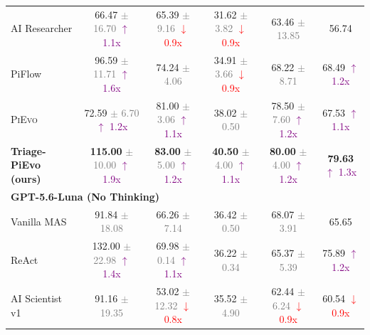 \documentclass{article}
\newcommand{\pievo}{\textsc{PiEvo}\,}
\begin{document}
\begin{table}[!ht]
{\begin{tabular}{l | cccc | c}
AI Researcher & 66.47 \textcolor{gray}{\scriptsize $\pm$ 16.70} \textcolor{purple}{\scriptsize $\uparrow$ 1.1x} & 65.39 \textcolor{gray}{\scriptsize $\pm$ 9.16} \textcolor{red}{\scriptsize $\downarrow$ 0.9x} & 31.62 \textcolor{gray}{\scriptsize $\pm$ 3.82} \textcolor{red}{\scriptsize $\downarrow$ 0.9x} & 63.46 \textcolor{gray}{\scriptsize $\pm$ 13.85} & 56.74  \\
PiFlow & 96.59 \textcolor{gray}{\scriptsize $\pm$ 11.71} \textcolor{purple}{\scriptsize $\uparrow$ 1.6x} & 74.24 \textcolor{gray}{\scriptsize $\pm$ 4.06} & 34.91 \textcolor{gray}{\scriptsize $\pm$ 3.66} \textcolor{red}{\scriptsize $\downarrow$ 0.9x} & 68.22 \textcolor{gray}{\scriptsize $\pm$ 8.71} & 68.49  \textcolor{purple}{\scriptsize $\uparrow$ 1.2x} \\
\pievo{} & 72.59 \textcolor{gray}{\scriptsize $\pm$ 6.70} \textcolor{purple}{\scriptsize $\uparrow$ 1.2x} & 81.00 \textcolor{gray}{\scriptsize $\pm$ 3.06} \textcolor{purple}{\scriptsize $\uparrow$ 1.1x} & 38.02 \textcolor{gray}{\scriptsize $\pm$ 0.50} & 78.50 \textcolor{gray}{\scriptsize $\pm$ 7.60} \textcolor{purple}{\scriptsize $\uparrow$ 1.2x} & 67.53  \textcolor{purple}{\scriptsize $\uparrow$ 1.1x} \\
\textbf{Triage-PiEvo (ours)} & \textbf{115.00} \textcolor{gray}{\scriptsize $\pm$ 10.00} \textcolor{purple}{\scriptsize $\uparrow$ 1.9x} & \textbf{83.00} \textcolor{gray}{\scriptsize $\pm$ 5.00} \textcolor{purple}{\scriptsize $\uparrow$ 1.2x} & \textbf{40.50} \textcolor{gray}{\scriptsize $\pm$ 4.00} \textcolor{purple}{\scriptsize $\uparrow$ 1.1x} & \textbf{80.00} \textcolor{gray}{\scriptsize $\pm$ 4.00} \textcolor{purple}{\scriptsize $\uparrow$ 1.2x} & \textbf{79.63}  \textcolor{purple}{\scriptsize $\uparrow$ 1.3x} \\
\midrule
\multicolumn{6}{l}{\textbf{GPT-5.6-Luna (No Thinking)}} \\
\midrule
Vanilla MAS & 91.84 \textcolor{gray}{\scriptsize $\pm$ 18.08} & 66.26 \textcolor{gray}{\scriptsize $\pm$ 7.14} & 36.42 \textcolor{gray}{\scriptsize $\pm$ 0.50} & 68.07 \textcolor{gray}{\scriptsize $\pm$ 3.91} & 65.65  \\
ReAct & 132.00 \textcolor{gray}{\scriptsize $\pm$ 22.98} \textcolor{purple}{\scriptsize $\uparrow$ 1.4x} & 69.98 \textcolor{gray}{\scriptsize $\pm$ 0.14} \textcolor{purple}{\scriptsize $\uparrow$ 1.1x} & 36.22 \textcolor{gray}{\scriptsize $\pm$ 0.34} & 65.37 \textcolor{gray}{\scriptsize $\pm$ 5.39} & 75.89  \textcolor{purple}{\scriptsize $\uparrow$ 1.2x} \\
AI Scientist v1 & 91.16 \textcolor{gray}{\scriptsize $\pm$ 19.35} & 53.02 \textcolor{gray}{\scriptsize $\pm$ 12.32} \textcolor{red}{\scriptsize $\downarrow$ 0.8x} & 35.52 \textcolor{gray}{\scriptsize $\pm$ 4.90} & 62.44 \textcolor{gray}{\scriptsize $\pm$ 6.24} \textcolor{red}{\scriptsize $\downarrow$ 0.9x} & 60.54  \textcolor{red}{\scriptsize $\downarrow$ 0.9x} \\

\end{tabular}}
\end{table}
\end{document}
